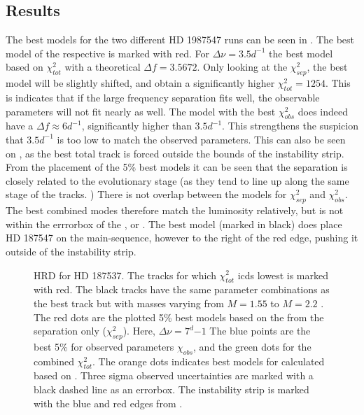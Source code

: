 \subsection{Results}
The best models for the two different HD 1987547 runs can be seen in . The best model of the respective \chis is marked with red. For $\Delta \nu=3.5 d^{-1}$ the best model based on $\chi_{tot}^2$ with a theoretical $\Delta f = 3.5672$. Only looking at the $\chi_{sep}^2$, the best model will be slightly shifted, and obtain a significantly higher $\chi_{tot}^2=1254$. This is indicates that if the large frequency separation fits well, the observable parameters will not fit nearly as well. The model with the best $\chi_{obs}^2$ does indeed have a $\Delta f \approx 6d^{-1}$, significantly higher than $3.5d^{-1}$. This strengthens the suspicion that $3.5 d^{-1}$ is too low to match the observed parameters. This can also be seen on , as the best total track is forced outside the bounds of the instability strip.  From the placement of the 5\% best models it can be seen that the separation is closely related to the evolutionary stage (as they tend to line up along the same stage of the tracks. ) There is not overlap between the models for $\chi_{sep}^2$ and $\chi_{obs}^2$. The best combined modes therefore match the luminosity relatively, but is not within the errrorbox of the \teff, or \lum. The best model (marked in black) does place HD 187547 on the main-sequence, however to the right of the red edge, pushing it outside of the instability strip. 
\begin{figure}[htbp]
	\centering
	\caption{HRD for HD 187537. The tracks for which $\chi_{tot}^2$ icds lowest is marked with red. The black tracks have the same parameter combinations as the best track but with masses varying from $M=1.55$ to $M=2.2$ \msun. The red dots are the plotted 5\% best models based on the \chis from the separation only ($\chi_{sep}^2$).  Here, $\Delta \nu = 7^d{-1}$ The blue points are the best 5\% for observed parameters $\chi_{obs}$, and the green dots for the combined $\chi_{tot}^2$. The orange dots indicates best models for \chis calculated based on \lum. Three sigma observed uncertainties are marked with a black dashed line as an errorbox. The instability strip is marked with the blue and red edges from \citet{murphy2019gaia}.}
	\label{finalsuper}
\end{figure}
